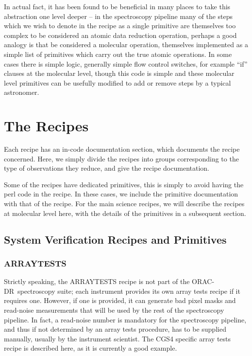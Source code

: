 \documentclass[twoside,11pt]{article}
\renewcommand{\_}{\texttt{\symbol{95}}}
\newcommand{\ORACDR}{{\footnotesize ORAC-DR}}
\begin{document}
In actual fact, it has been found to be beneficial in many places to
take this abstraction one level deeper -- in the spectroscopy pipeline
many of the steps which we wish to denote in the recipe as a single
primitive are themselves too complex to be considered an atomic data
reduction operation, perhaps a good analogy is that be considered a
molecular operation, themselves implemented as a simple list of
primitives which carry out the true atomic operations. In some cases
there is simple logic, generally simple flow control switches, for
example ``if'' clauses at the molecular level, though this code is
simple and these molecular level primitives can be usefully modified
to add or remove steps by a typical astronomer.

\section{The Recipes}

Each recipe has an in-code documentation section, which documents the
recipe concerned. Here, we simply divide the recipes into groups
corresponding to the type of observations they reduce, and give the
recipe documentation.

Some of the recipes have dedicated primitives, this is simply to
avoid having the perl code in the recipe. In these cases, we include
the primitive documentation with that of the recipe. For the main
science recipes, we will describe the recipes at molecular level
here, with the details of the primitives in a subsequent section.

\subsection{System Verification Recipes and Primitives}

\subsubsection{ARRAY\_TESTS}

Strictly speaking, the ARRAY\_TESTS recipe is not part of the \ORACDR\
spectroscopy suite; each instrument provides its own array tests
recipe if it requires one. However, if one is provided, it can
generate bad pixel masks and read-noise measurements that will be used
by the rest of the spectroscopy pipeline. In fact, a read-noise number
is mandatory for the spectroscopy pipeline, and thus if not determined
by an array tests procedure, has to be supplied manually, usually by
the instrument scientist. The CGS4 specific array tests recipe is
described here, as it is currently a good example.
\end{document}
